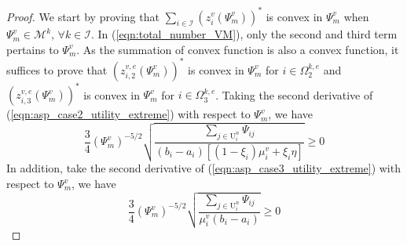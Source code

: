 \documentclass[conference]{IEEEtran}
\begin{document}
\iffalse
\begin{proof}
We start by proving that $\sum_{i \in \mathcal{I}} (z_{i}^v(\Psi_m^v))^*$ is convex in $\Psi_m^v$ when $\Psi_m^v \in \mathcal{M}^k,\, \forall k \in \mathcal{I}$. In (\ref{eqn:total_number_VM}), only the second and third term pertains to $\Psi_m^v$. As the summation of convex function is also a convex function, it suffices to prove that $(z_{i,2}^{v,e}(\Psi_m^v))^*$ is convex in $\Psi_m^v$ for $i \in \Omega_2^{k,e}$ and $(z_{i,3}^{v,e}(\Psi_m^v))^*$ is convex in $\Psi_m^v$ for $i \in \Omega_3^{k,e}$. Taking the second derivative of (\ref{eqn:asp_case2_utility_extreme}) with respect to $\Psi_m^v$, we have
\begin{equation}
\frac{3}{4}(\Psi_m^v)^{-5/2}\sqrt{\frac{\sum_{j \in \mathrm{U}_i^n}\Psi_{ij}}{(b_i-a_i)[(1-\xi_i)\mu_i^v + \xi_i \eta]}} \geq 0
\end{equation}
In addition, take the second derivative of (\ref{eqn:asp_case3_utility_extreme}) with respect to $\Psi_m^v$, we have
\begin{equation}
\frac{3}{4}(\Psi_m^v)^{-5/2}\sqrt{\frac{\sum_{j \in \mathrm{U}_i^n}\Psi_{ij}}{\mu_i^v(b_i-a_i)}} \geq 0
\end{equation}


\end{proof}
\end{document}
